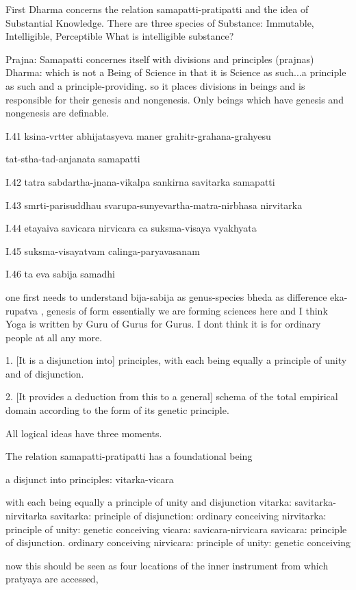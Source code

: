 First Dharma concerns the relation samapatti-pratipatti
and the idea of Substantial Knowledge.
There are three species of Substance:
Immutable, Intelligible, Perceptible
What is intelligible substance?

Prajna: Samapatti concernes itself with divisions and principles (prajnas)
Dharma: which is not a Being of Science
in that it is Science as such...a principle as such and a principle-providing.
so it places divisions in beings and is responsible for their genesis
and nongenesis. Only beings which have genesis and nongenesis are definable.

I.41
ksina-vrtter abhijatasyeva maner grahitr-grahana-grahyesu

tat-stha-tad-anjanata samapatti

I.42
tatra sabdartha-jnana-vikalpa sankirna savitarka samapatti

I.43
smrti-parisuddhau svarupa-sunyevartha-matra-nirbhasa nirvitarka

I.44
etayaiva savicara nirvicara ca suksma-visaya vyakhyata

I.45
suksma-visayatvam calinga-paryavasanam

I.46
ta eva sabija samadhi

one first needs to understand
bija-sabija as genus-species
bheda as difference
eka-rupatva , genesis of form
essentially we are forming sciences here
and I think Yoga is written by Guru of Gurus for Gurus.
I dont think it is for ordinary people at all any more.

1. [It is a disjunction into] principles,
with each being equally a principle
of unity and of disjunction.

2. [It provides a deduction from this to a general]
schema of the total empirical domain
according to the form of its genetic principle.

All logical ideas have three moments.

The relation samapatti-pratipatti has a foundational being

a disjunct into principles:
vitarka-vicara

with each being equally a principle of unity and disjunction
vitarka: savitarka-nirvitarka
savitarka: principle of disjunction: ordinary conceiving
nirvitarka: principle of unity: genetic conceiving
vicara: savicara-nirvicara
savicara: principle of disjunction. ordinary conceiving
nirvicara: principle of unity: genetic conceiving

now this should be seen as four locations of the inner instrument
from which pratyaya are accessed,

